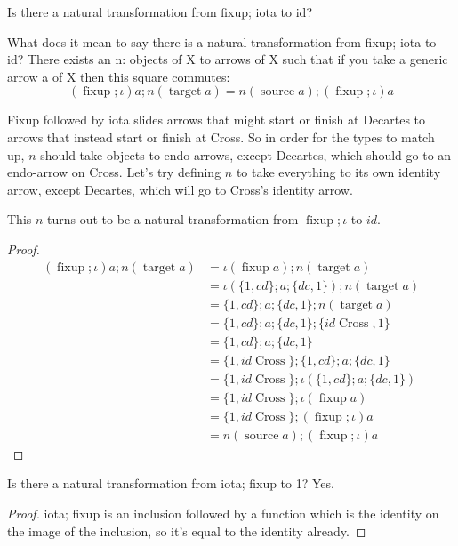 \documentclass{proc-l}
\theoremstyle{definition}
\theoremstyle{remark}
\numberwithin{equation}{section}
\begin{document}
Is there a natural transformation from fixup; iota to id?

What does it mean to say there is a natural transformation from fixup; iota to id?
There exists an n: objects of X to arrows of X
such that if you take a generic arrow a of X
then this square commutes:
\[
(\operatorname{fixup}; \iota) a; n (\operatorname{target} a) = n (\operatorname{source} a); (\operatorname{fixup}; \iota) a
\]

Fixup followed by iota slides arrows that might start or finish at Decartes to arrows that instead start or finish at Cross.
So in order for the types to match up, \(n\) should take objects to endo-arrows, except Decartes, which should go to an endo-arrow on Cross.
Let's try defining \(n\) to take everything to its own identity arrow,
except Decartes, which will go to Cross's identity arrow. 

This \(n\) turns out to be a natural transformation from \(\operatorname{fixup}; \iota\) to \(id\).

\begin{proof}
\begin{align*}
(\operatorname{fixup}; \iota) a; n (\operatorname{target} a) & = \iota (\operatorname{fixup} a); n (\operatorname{target} a) \\
& = \iota (\{ 1, cd \}; a; \{ dc, 1 \}); n (\operatorname{target} a) \\      
& = \{ 1, cd \}; a; \{ dc, 1 \}; n (\operatorname{target} a) \\
& = \{ 1, cd \}; a; \{ dc, 1 \}; \{ id \operatorname{Cross}, 1 \} \\
& = \{ 1, cd \}; a; \{ dc, 1 \} \\
& = \{ 1, id \operatorname{Cross} \}; \{ 1, cd \}; a; \{ dc, 1 \} \\
& = \{ 1, id \operatorname{Cross} \}; \iota (\{ 1, cd \}; a; \{ dc, 1 \}) \\
& = \{ 1, id \operatorname{Cross} \}; \iota (\operatorname{fixup} a) \\
& = \{ 1, id \operatorname{Cross} \}; (\operatorname{fixup}; \iota) a \\   
& = n (\operatorname{source} a); (\operatorname{fixup}; \iota) a
\end{align*}
\end{proof}

Is there a natural transformation from iota; fixup to 1? Yes.

\begin{proof}
iota; fixup is an inclusion followed by a function which is the identity on the image of the inclusion,
so it's equal to the identity already.
\end{proof}
\end{document}
